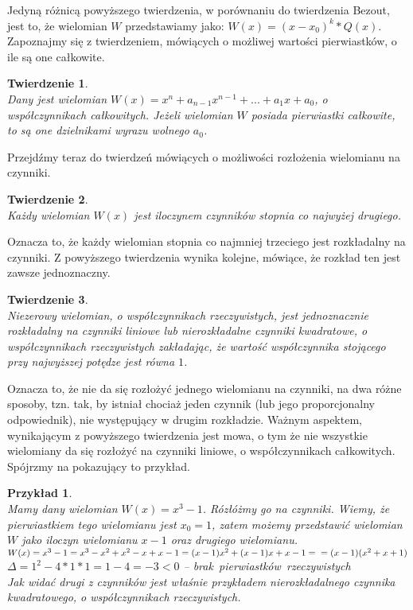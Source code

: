 \documentclass[twoside,a4paper]{book}
\newtheorem{theorem}{Twierdzenie}
\newtheorem{example}{Przykład}
\begin{document}
Jedyną różnicą powyższego twierdzenia, w porównaniu do twierdzenia Bezout, jest to, że wielomian $W$ przedstawiamy jako: $W(x) = (x-x_0)^k * Q(x)$. Zapoznajmy się z twierdzeniem, mówiących o możliwej wartości pierwiastków, o ile są one całkowite.

\begin{theorem}
	$ $\\
	Dany jest wielomian $W(x) = x^n + a_{n-1}x^{n-1} + ... + a_1x + a_0$, o współczynnikach całkowitych. Jeżeli wielomian $W$ posiada pierwiastki całkowite, to są one dzielnikami wyrazu wolnego $a_0$.
\end{theorem}

Przejdźmy teraz do twierdzeń mówiących o możliwości rozłożenia wielomianu na czynniki.

\begin{theorem}
	$ $\\
	Każdy wielomian $W(x)$ jest iloczynem czynników stopnia co najwyżej drugiego.
\end{theorem}

Oznacza to, że każdy wielomian stopnia co najmniej trzeciego jest rozkładalny na czynniki. Z powyższego twierdzenia wynika kolejne, mówiące, że rozkład ten jest zawsze jednoznaczny.

\begin{theorem}
	$ $\\
	Niezerowy wielomian, o współczynnikach rzeczywistych, jest jednoznacznie rozkładalny na czynniki liniowe lub nierozkładalne czynniki kwadratowe, o współczynnikach rzeczywistych zakładając, że wartość współczynnika stojącego przy najwyższej potędze jest równa $1$.
\end{theorem}

Oznacza to, że nie da się rozłożyć jednego wielomianu na czynniki, na dwa różne sposoby, tzn. tak, by istniał chociaż jeden czynnik (lub jego proporcjonalny odpowiednik), nie występujący w drugim rozkładzie. Ważnym aspektem, wynikającym z powyższego twierdzenia jest mowa, o tym że nie wszystkie wielomiany da się rozłożyć na czynniki liniowe, o współczynnikach całkowitych. Spójrzmy na pokazujący to przykład.

\begin{example}
	$ $\\
	Mamy dany wielomian $W(x)=x^3-1$. Rózłóżmy go na czynniki.
	Wiemy, że pierwiastkiem tego wielomianu jest $x_0 = 1$, zatem możemy przedstawić wielomian $W$ jako iloczyn wielomianu $x-1$ oraz drugiego wielomianu. \\
	$W(x)=x^3-1=x^3-x^2+x^2-x+x-1=(x-1)x^2+(x-1)x+x-1 = \\
	=(x-1)(x^2+x+1)$ \\
	$\Delta = 1^2 - 4*1*1 = 1 - 4 = -3 < 0$ -- brak\ pierwiastków\ rzeczywistych\\
	Jak widać drugi z czynników jest właśnie przykładem nierozkładalnego czynnika kwadratowego, o współczynnikach rzeczywistych.
\end{example}
\end{document}
